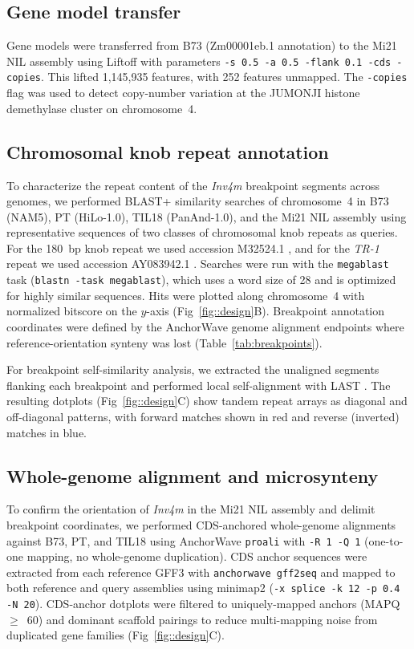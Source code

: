 \documentclass[9pt,twocolumn,twoside]{rilabRxiv}
\newcommand{\invfour}{\textit{Inv4m}\xspace}
\begin{document}
\subsection{Gene model transfer}

Gene models were transferred from B73 (Zm00001eb.1 annotation) to the Mi21 NIL assembly using Liftoff \cite{shumate2021} with parameters \texttt{-s~0.5 -a~0.5 -flank~0.1 -cds -copies}.
This lifted 1,145,935 features, with 252 features unmapped.
The \texttt{-copies} flag was used to detect copy-number variation at the JUMONJI histone demethylase cluster on chromosome~4.

\subsection{Chromosomal knob repeat annotation}

To characterize the repeat content of the \invfour breakpoint segments across genomes, we performed BLAST+ \cite{camacho2009} similarity searches of chromosome~4 in B73 (NAM5), PT (HiLo-1.0), TIL18 (PanAnd-1.0), and the Mi21 NIL assembly using representative sequences of two classes of chromosomal knob repeats as queries.
For the 180~bp knob repeat we used accession M32524.1 \cite{dennis1984}, and for the \textit{TR-1} repeat we used accession AY083942.1 \cite{hsu2003}.
Searches were run with the \texttt{megablast} task (\texttt{blastn -task megablast}), which uses a word size of 28 and is optimized for highly similar sequences.
Hits were plotted along chromosome~4 with normalized bitscore on the $y$-axis (Fig~\ref{fig::design}B).
Breakpoint annotation coordinates were defined by the AnchorWave \cite{song2022} genome alignment endpoints where reference-orientation synteny was lost (Table~\ref{tab:breakpoints}).

For breakpoint self-similarity analysis, we extracted the unaligned segments flanking each breakpoint and performed local self-alignment with LAST \cite{kielbasa2011}.
The resulting dotplots (Fig~\ref{fig::design}C) show tandem repeat arrays as diagonal and off-diagonal patterns, with forward matches shown in red and reverse (inverted) matches in blue.

\subsection{Whole-genome alignment and microsynteny}

To confirm the orientation of \invfour in the Mi21 NIL assembly and delimit breakpoint coordinates, we performed CDS-anchored whole-genome alignments against B73, PT, and TIL18 using AnchorWave \cite{song2022} \texttt{proali} with \texttt{-R~1 -Q~1} (one-to-one mapping, no whole-genome duplication).
CDS anchor sequences were extracted from each reference GFF3 with \texttt{anchorwave gff2seq} and mapped to both reference and query assemblies using minimap2 \cite{li2018minimap2} (\texttt{-x splice -k 12 -p 0.4 -N 20}).
CDS-anchor dotplots were filtered to uniquely-mapped anchors (MAPQ~$\geq$~60) and dominant scaffold pairings to reduce multi-mapping noise from duplicated gene families (Fig~\ref{fig::design}C).
\end{document}

